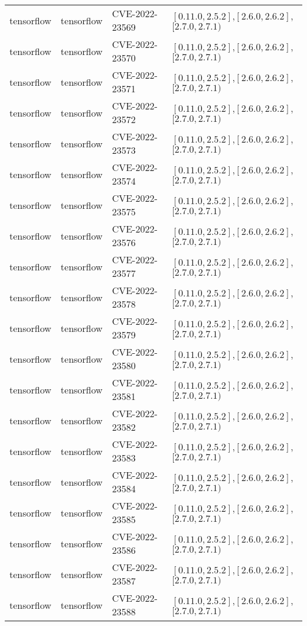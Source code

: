 \begin{tabular}{llll}
tensorflow & tensorflow & CVE-2022-23569 & $[0.11.0,2.5.2]$,$[2.6.0,2.6.2]$,$[2.7.0,2.7.1)$ \\
tensorflow & tensorflow & CVE-2022-23570 & $[0.11.0,2.5.2]$,$[2.6.0,2.6.2]$,$[2.7.0,2.7.1)$ \\
tensorflow & tensorflow & CVE-2022-23571 & $[0.11.0,2.5.2]$,$[2.6.0,2.6.2]$,$[2.7.0,2.7.1)$ \\
tensorflow & tensorflow & CVE-2022-23572 & $[0.11.0,2.5.2]$,$[2.6.0,2.6.2]$,$[2.7.0,2.7.1)$ \\
tensorflow & tensorflow & CVE-2022-23573 & $[0.11.0,2.5.2]$,$[2.6.0,2.6.2]$,$[2.7.0,2.7.1)$ \\
tensorflow & tensorflow & CVE-2022-23574 & $[0.11.0,2.5.2]$,$[2.6.0,2.6.2]$,$[2.7.0,2.7.1)$ \\
tensorflow & tensorflow & CVE-2022-23575 & $[0.11.0,2.5.2]$,$[2.6.0,2.6.2]$,$[2.7.0,2.7.1)$ \\
tensorflow & tensorflow & CVE-2022-23576 & $[0.11.0,2.5.2]$,$[2.6.0,2.6.2]$,$[2.7.0,2.7.1)$ \\
tensorflow & tensorflow & CVE-2022-23577 & $[0.11.0,2.5.2]$,$[2.6.0,2.6.2]$,$[2.7.0,2.7.1)$ \\
tensorflow & tensorflow & CVE-2022-23578 & $[0.11.0,2.5.2]$,$[2.6.0,2.6.2]$,$[2.7.0,2.7.1)$ \\
tensorflow & tensorflow & CVE-2022-23579 & $[0.11.0,2.5.2]$,$[2.6.0,2.6.2]$,$[2.7.0,2.7.1)$ \\
tensorflow & tensorflow & CVE-2022-23580 & $[0.11.0,2.5.2]$,$[2.6.0,2.6.2]$,$[2.7.0,2.7.1)$ \\
tensorflow & tensorflow & CVE-2022-23581 & $[0.11.0,2.5.2]$,$[2.6.0,2.6.2]$,$[2.7.0,2.7.1)$ \\
tensorflow & tensorflow & CVE-2022-23582 & $[0.11.0,2.5.2]$,$[2.6.0,2.6.2]$,$[2.7.0,2.7.1)$ \\
tensorflow & tensorflow & CVE-2022-23583 & $[0.11.0,2.5.2]$,$[2.6.0,2.6.2]$,$[2.7.0,2.7.1)$ \\
tensorflow & tensorflow & CVE-2022-23584 & $[0.11.0,2.5.2]$,$[2.6.0,2.6.2]$,$[2.7.0,2.7.1)$ \\
tensorflow & tensorflow & CVE-2022-23585 & $[0.11.0,2.5.2]$,$[2.6.0,2.6.2]$,$[2.7.0,2.7.1)$ \\
tensorflow & tensorflow & CVE-2022-23586 & $[0.11.0,2.5.2]$,$[2.6.0,2.6.2]$,$[2.7.0,2.7.1)$ \\
tensorflow & tensorflow & CVE-2022-23587 & $[0.11.0,2.5.2]$,$[2.6.0,2.6.2]$,$[2.7.0,2.7.1)$ \\
tensorflow & tensorflow & CVE-2022-23588 & $[0.11.0,2.5.2]$,$[2.6.0,2.6.2]$,$[2.7.0,2.7.1)$ \\

\end{tabular}
